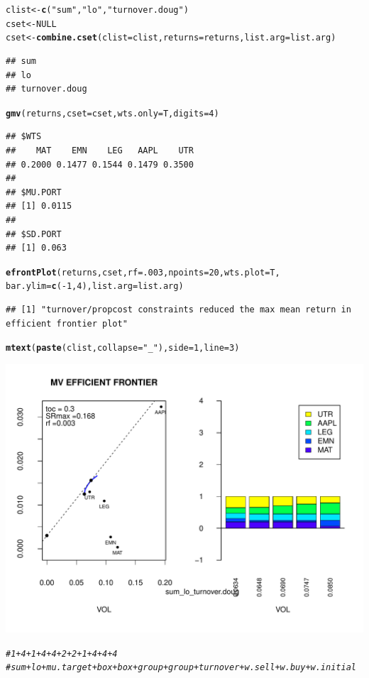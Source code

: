 \documentclass{uwstat518}\usepackage[]{graphicx}\usepackage[]{color}
\makeatletter
\def\maxwidth{ %
  \ifdim\Gin@nat@width>\linewidth
    \linewidth
  \else
    \Gin@nat@width
  \fi
}
\newcommand{\hlstr}[1]{\textcolor[rgb]{0.192,0.494,0.8}{#1}}%
\newcommand{\hlcom}[1]{\textcolor[rgb]{0.678,0.584,0.686}{\textit{#1}}}%
\newcommand{\hlkwd}[1]{\textcolor[rgb]{0.737,0.353,0.396}{\textbf{#1}}}%
\newenvironment{kframe}{%
 \def\at@end@of@kframe{}%
 \ifinner\ifhmode%
  \def\at@end@of@kframe{\end{minipage}}%
  \begin{minipage}{\columnwidth}%
 \fi\fi%
 \def\FrameCommand##1{\hskip\@totalleftmargin \hskip-\fboxsep
 \colorbox{shadecolor}{##1}\hskip-\fboxsep
     \hskip-\linewidth \hskip-\@totalleftmargin \hskip\columnwidth}%
 \MakeFramed {\advance\hsize-\width
   \@totalleftmargin\z@ \linewidth\hsize
   \@setminipage}}%
 {\par\unskip\endMakeFramed%
 \at@end@of@kframe}
\newenvironment{knitrout}{}{} %
\makeatother
\begin{document}
\begin{knitrout}
\begin{kframe}
\begin{alltt}
clist <- \hlkwd{c}(\hlstr{"sum"},\hlstr{"lo"},\hlstr{"turnover.doug"})
cset <- NULL
cset <-\hlkwd{combine.cset}(clist=clist,returns=returns,list.arg=list.arg)
\end{alltt}
\begin{verbatim}
## sum 
## lo 
## turnover.doug
\end{verbatim}
\begin{alltt}
\hlkwd{gmv}(returns, cset=cset, wts.only=T,digits=4)
\end{alltt}
\begin{verbatim}
## $WTS
##    MAT    EMN    LEG   AAPL    UTR 
## 0.2000 0.1477 0.1544 0.1479 0.3500 
## 
## $MU.PORT
## [1] 0.0115
## 
## $SD.PORT
## [1] 0.063
\end{verbatim}
\begin{alltt}
\hlkwd{efrontPlot}(returns, cset, rf = .003, npoints = 20,wts.plot = T,
		bar.ylim = \hlkwd{c}(-1,4),list.arg=list.arg)
\end{alltt}
\begin{verbatim}
## [1] "turnover/propcost constraints reduced the max mean return in efficient frontier plot"
\end{verbatim}
\begin{alltt}
\hlkwd{mtext}(\hlkwd{paste}(clist,collapse=\hlstr{"_"}),side=1,line=3)
\end{alltt}
\end{kframe}
\includegraphics[width=\maxwidth]{figure/unnamed-chunk-102} 
\begin{kframe}\begin{alltt}
\hlcom{# 1+4+1+4+4+2+2+1+4+4+4  }
\hlcom{# sum+lo+mu.target+box+box+group+group+turnover+w.sell+w.buy+w.initial}
\end{alltt}
\end{kframe}
\end{knitrout}
\end{document}
